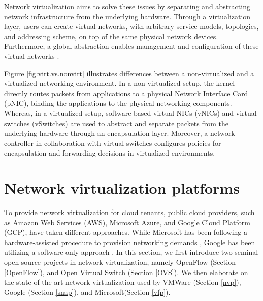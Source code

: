Network virtualization aims to solve these issues by separating and abstracting 
network infrastructure from the underlying hardware.
Through a virtualization layer, users can create virtual networks, with arbitrary service 
models, topologies, and addressing scheme, on top of the same physical network devices. Furthermore, 
a global abstraction enables management and configuration of these virtual networks 
\cite{mckeown2008openflow}.

Figure \ref{fig:virt.vs.nonvirt} illustrates differences between a non-virtualized and a
virtualized networking environment. In a non-virtualized setup, the kernel directly routes 
packets from applications to a physical Network Interface Card (pNIC), binding the applications 
to the physical networking components. Whereas, in a virtualized setup, software-based virtual NICs (vNICs) 
and virtual switches (vSwitches) are used to abstract and separate packets from the underlying hardware through an 
encapsulation layer. Moreover, a network controller in collaboration with virtual switches configures
policies for encapsulation and forwarding decisions in virtualized environments.

\section{Network virtualization platforms}
\label{sec:network.virt.platform}

To provide network virtualization for cloud tenants, public cloud providers, such as Amazon 
Web Services (AWS), Microsoft Azure, and Google Cloud Platform (GCP), have taken different 
approaches. While Microsoft has been following a hardware-assisted procedure to provision 
networking demands \cite{firestone2018azure, firestone2017vfp}, Google has been utilizing 
a software-only approach \cite{marty2019snap}. In this section, we first introduce two seminal 
open-source projects in network virtualization, namely OpenFlow (Section \ref{OpenFlow}), 
and Open Virtual Switch (Section \ref{OVS}). We then elaborate on the state-of-the art network 
virtualization used by VMWare (Section \ref{nvp}), Google (Section \ref{snap}), and 
Microsoft(Section \ref{vfp}).

